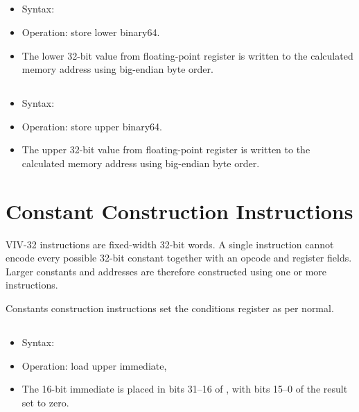 \subsection{}

\begin{itemize}
\item Syntax: 
\item Operation: store lower binary64.
\item The lower 32-bit value from floating-point register  is written
      to the calculated memory address using big-endian byte order.
\end{itemize}

\subsection{}

\begin{itemize}
\item Syntax: 
\item Operation: store upper binary64.
\item The upper 32-bit value from floating-point register  is written
      to the calculated memory address using big-endian byte order.
\end{itemize}

\section{Constant Construction Instructions}

VIV-32 instructions are fixed-width 32-bit words. A single instruction cannot
encode every possible 32-bit constant together with an opcode and register
fields. Larger constants and addresses are therefore constructed using one or
more instructions.

Constants construction instructions set the conditions register  as
per normal.

\subsection{}

\begin{itemize}
  \item Syntax: 
  \item Operation: load upper immediate, 
  \item The 16-bit immediate is placed in bits 31--16 of , with bits
        15--0 of the result set to zero.
\end{itemize}

